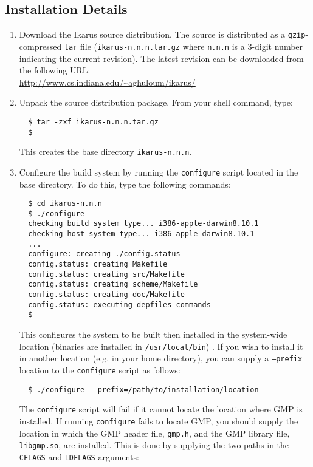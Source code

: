 \documentclass[onecolumn, 12pt, twoside, openright, dvipdfm]{book}
\begin{document}
\subsection{Installation Details}

\begin{enumerate}

\item Download the Ikarus source distribution.  The source is
distributed as a \texttt{gzip}-compressed \texttt{tar} file
(\texttt{ikarus-n.n.n.tar.gz} where \texttt{n.n.n} is a 3-digit
number indicating the current revision).  The latest revision can be
downloaded from the following URL:\\
\url{http://www.cs.indiana.edu/~aghuloum/ikarus/}

\item Unpack the source distribution package.  From your shell
command, type:
\begin{verbatim}
  $ tar -zxf ikarus-n.n.n.tar.gz
  $
\end{verbatim}
This creates the base directory \texttt{ikarus-n.n.n}.

\item Configure the build system by running the \texttt{configure}
script located in the base directory.  To do this, type the
following commands:
\begin{verbatim}
  $ cd ikarus-n.n.n
  $ ./configure
  checking build system type... i386-apple-darwin8.10.1
  checking host system type... i386-apple-darwin8.10.1
  ...
  configure: creating ./config.status
  config.status: creating Makefile
  config.status: creating src/Makefile
  config.status: creating scheme/Makefile
  config.status: creating doc/Makefile
  config.status: executing depfiles commands
  $
\end{verbatim}

This configures the system to be built then installed in the
system-wide location (binaries are installed in
\texttt{/usr/local/bin}) .  If you wish to install it
in another location (e.g. in your home directory), you can supply
a \texttt{--prefix} location to the \texttt{configure} script as
follows:

\begin{verbatim}
  $ ./configure --prefix=/path/to/installation/location
\end{verbatim}

The \texttt{configure} script will fail if it cannot locate the
location where GMP is installed.  If running \texttt{configure}
fails to locate GMP, you should supply the location in which the GMP
header file, \texttt{gmp.h}, and the GMP library file,
\texttt{libgmp.so}, are installed.  This is done by supplying the
two paths in the \texttt{CFLAGS} and \texttt{LDFLAGS} arguments:


\end{enumerate}
\end{document}
